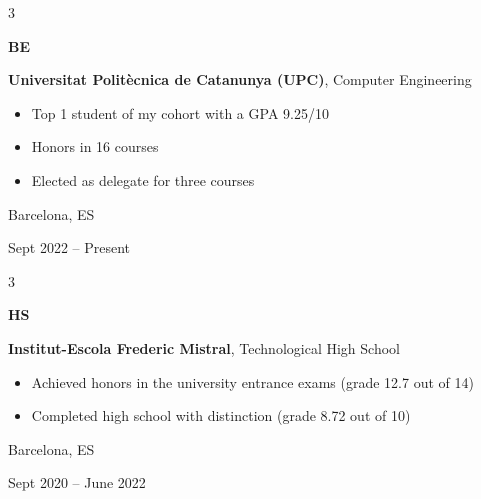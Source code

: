 \documentclass[10pt, letterpaper]{article}
\newenvironment{highlights}{
    \begin{itemize}[
        topsep=0.10 cm,
        parsep=0.10 cm,
        partopsep=0pt,
        itemsep=0pt,
        leftmargin=0.4 cm + 10pt
    ]
}{
    \end{itemize}
} %
\newenvironment{threecolentry}[3][]{
    \onecolentry
    \def\thirdColumn{#3}
    \setcolumnwidth{1 cm, \fill, 4.5 cm}
    \begin{paracol}{3}
    {\raggedright #2} \switchcolumn
}{
    \switchcolumn \raggedleft \thirdColumn
    \end{paracol}
    \endonecolentry
} %
\begin{document}
        \begin{threecolentry}{\textbf{BE}}{
            Barcelona, ES
            
            Sept 2022 – Present
        }
            \textbf{Universitat Politècnica de Catanunya (UPC)}, Computer Engineering
            \begin{highlights}
                \item Top 1 student of my cohort with a GPA 9.25/10
                \item Honors in 16 courses
                \item Elected as delegate for three courses
            \end{highlights}
        \end{threecolentry}

        \vspace{0.2 cm}

        \begin{threecolentry}{\textbf{HS}}{
            Barcelona, ES
            
            Sept 2020 – June 2022
        }
            \textbf{Institut-Escola Frederic Mistral}, Technological High School
            \begin{highlights}
                \item Achieved honors in the university entrance exams (grade 12.7 out of 14)
                \item Completed high school with distinction (grade 8.72 out of 10)
            \end{highlights}
        \end{threecolentry}
        
    
\end{document}
